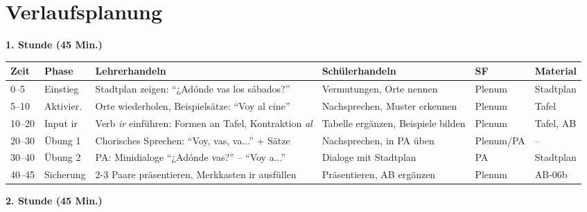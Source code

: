 \documentclass[11pt,a4paper]{article}
\begin{document}
\section{Verlaufsplanung}

\textbf{1. Stunde (45 Min.)}

\begin{longtable}{|p{1cm}|p{1.5cm}|p{4cm}|p{3cm}|p{1.5cm}|p{2cm}|}
\hline
\textbf{Zeit} & \textbf{Phase} & \textbf{Lehrerhandeln} & \textbf{Schülerhandeln} & \textbf{SF} & \textbf{Material} \\
\hline
\endhead

0--5 & Einstieg & Stadtplan zeigen: ``¿Adónde vas los sábados?'' & Vermutungen, Orte nennen & Plenum & Stadtplan \\
\hline

5--10 & Aktivier. & Orte wiederholen, Beispielsätze: ``Voy al cine'' & Nachsprechen, Muster erkennen & Plenum & Tafel \\
\hline

10--20 & Input ir & Verb \textit{ir} einführen: Formen an Tafel, Kontraktion \textit{al} & Tabelle ergänzen, Beispiele bilden & Plenum & Tafel, AB \\
\hline

20--30 & Übung 1 & Chorisches Sprechen: ``Voy, vas, va...'' + Sätze & Nachsprechen, in PA üben & Plenum/PA & -- \\
\hline

30--40 & Übung 2 & PA: Minidialoge ``¿Adónde vas?'' -- ``Voy a...'' & Dialoge mit Stadtplan & PA & Stadtplan \\
\hline

40--45 & Sicherung & 2-3 Paare präsentieren, Merkkasten ir ausfüllen & Präsentieren, AB ergänzen & Plenum & AB-06b \\
\hline
\end{longtable}

\vspace{1em}

\textbf{2. Stunde (45 Min.)}
\end{document}

